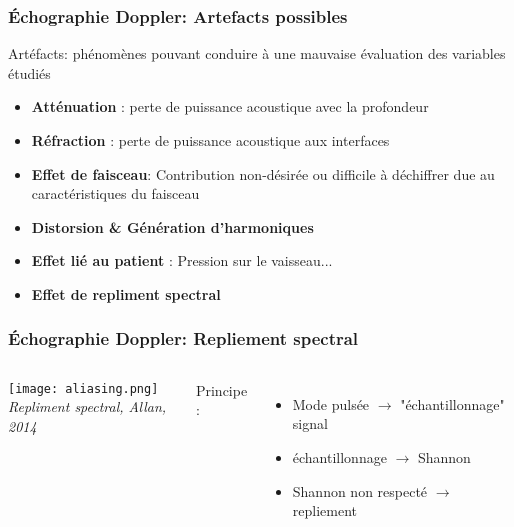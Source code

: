 \documentclass{beamer}
\begin{document}
\begin{frame}
\frametitle{\'Echographie Doppler: Artefacts possibles}
Artéfacts: phénomènes pouvant conduire à une mauvaise évaluation des variables étudiés
\begin{itemize}
\item \textbf{Atténuation }: perte de puissance acoustique avec la profondeur 
\vspace{0.2cm}
\item \textbf{Réfraction} : perte de puissance acoustique aux interfaces 
\vspace{0.2cm}
\item \textbf{Effet de faisceau}: Contribution non-désirée ou difficile à déchiffrer due au caractéristiques du faisceau
\vspace{0.2cm}
\item \textbf{Distorsion \& Génération d'harmoniques}
\vspace{0.2cm}
\item \textbf{Effet lié au patient} : Pression sur le vaisseau...
\vspace{0.2cm}
\item \textbf{Effet de repliment spectral}
\end{itemize}

\end{frame}

\begin{frame}
\frametitle{\'Echographie Doppler: Repliement spectral}
\begin{columns}
\column{60mm}
\begin{center}
\texttt{[image: aliasing.png]}\\
\textit{\footnotesize Repliment spectral, Allan, 2014}
\end{center}
\column{60mm}
Principe :
\vspace{0.3cm}
\begin{itemize}
\item Mode pulsée $\rightarrow$ "échantillonnage" signal 
\vspace{0.3cm}
\item échantillonnage $\rightarrow$ Shannon
\vspace{0.3cm}
\item Shannon non respecté $\rightarrow$  repliement
\vspace{0.3cm}
\end{itemize}
\end{columns}
\end{frame}
\end{document}

